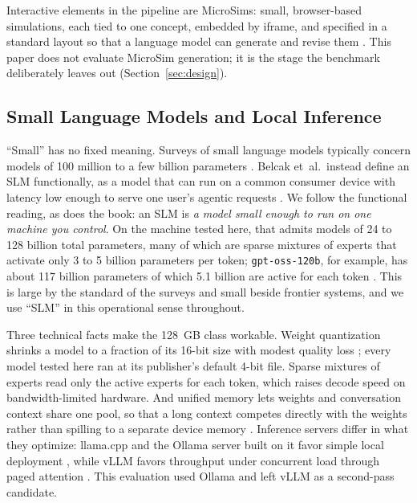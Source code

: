 \documentclass[11pt]{article}
\begin{document}
Interactive elements in the pipeline are MicroSims: small, browser-based simulations, each tied to one concept, embedded by iframe, and specified in a standard layout so that a language model can generate and revise them \cite{mccreary2025microsims}. This paper does not evaluate MicroSim generation; it is the stage the benchmark deliberately leaves out (Section~\ref{sec:design}).

\subsection{Small Language Models and Local Inference}

``Small'' has no fixed meaning. Surveys of small language models typically concern models of 100 million to a few billion parameters \cite{lu2024slm, wang2024slmsurvey}. Belcak et~al.\ instead define an SLM functionally, as a model that can run on a common consumer device with latency low enough to serve one user's agentic requests \cite{belcak2025slm}. We follow the functional reading, as does the book: an SLM is \textit{a model small enough to run on one machine you control}. On the machine tested here, that admits models of 24 to 128 billion total parameters, many of which are sparse mixtures of experts \cite{shazeer2017moe} that activate only 3 to 5 billion parameters per token; \texttt{gpt-oss-120b}, for example, has about 117 billion parameters of which 5.1 billion are active for each token \cite{openai2025gptoss}. This is large by the standard of the surveys and small beside frontier systems, and we use ``SLM'' in this operational sense throughout.

Three technical facts make the 128~GB class workable. Weight quantization shrinks a model to a fraction of its 16-bit size with modest quality loss \cite{dettmers2022llmint8, frantar2022gptq}; every model tested here ran at its publisher's default 4-bit file. Sparse mixtures of experts read only the active experts for each token, which raises decode speed on bandwidth-limited hardware. And unified memory lets weights and conversation context share one pool, so that a long context competes directly with the weights rather than spilling to a separate device memory \cite{nvidia2025dgxspark}. Inference servers differ in what they optimize: llama.cpp and the Ollama server built on it favor simple local deployment \cite{llamacpp, ollama}, while vLLM favors throughput under concurrent load through paged attention \cite{kwon2023vllm}. This evaluation used Ollama and left vLLM as a second-pass candidate.
\end{document}
